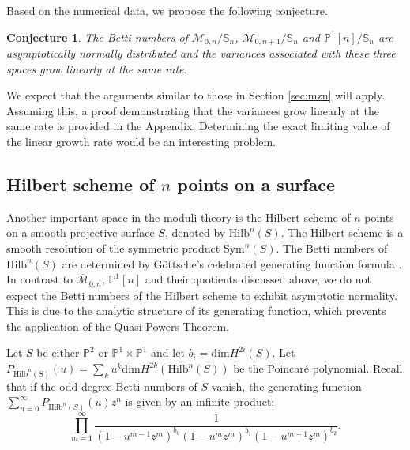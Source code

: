 \documentclass[11pt,letterpaper]{amsart}
\numberwithin{equation}{section}
\newtheorem{conjecture}[theorem]{Conjecture}
\theoremstyle{definition}
\def\red{\textcolor{red}}
\newcommand{\PP}{\mathbb{P}}
\newcommand{\cal}{\mathcal}
\def\cM{{\cal M}}
\def\mzn{\overline{\cM}_{0,n} }
\def\mzno{\overline{\cM}_{0,n+1} }
\def\dim{\mathrm{dim} }
\def\beq{\begin{equation}}
\def\eeq{\end{equation}}
\def\symS{\mathbb{S}}
\begin{document}
Based on the numerical data, we propose the following conjecture.
\begin{conjecture}
    The Betti numbers of $\mzn/\symS_n$, $\mzno/\symS_n$ and $\PP^1[n]/\symS_{n}$ are asymptotically normally distributed and the variances associated with these three spaces grow linearly at the same rate.
\end{conjecture}
We expect that the arguments similar to those in Section \ref{sec:mzn} will apply. Assuming this, a proof demonstrating that the variances grow linearly at the same rate is provided in the Appendix. Determining the exact limiting value of the linear growth rate would be an interesting problem.





\subsection{Hilbert scheme of $n$ points on a surface}


Another important space in the moduli theory is the Hilbert scheme of $n$ points on a smooth projective surface $S$, denoted by $\mathrm{Hilb}^n(S)$. The Hilbert scheme is a smooth resolution of the symmetric product $\mathrm{Sym}^n(S)$. The Betti numbers of $\mathrm{Hilb}^n(S)$ are determined by G\"{o}ttsche's celebrated generating function formula \cite{Gottsche}. In contrast to $\mzn$, $\PP^1[n]$ and their quotients discussed above, we do not expect the Betti numbers of the Hilbert scheme to exhibit asymptotic normality. This is due to the analytic structure of its generating function, which prevents the application of the Quasi-Powers Theorem.

Let $S$ be either $\PP^2$ or $\PP^1\times \PP^1$ %
and let $b_i=\dim H^{2i}(S)$. Let $P_{\mathrm{Hilb}^n(S)}(u)=\sum_k u^k\dim H^{2k}(\mathrm{Hilb}^n(S))$ be the Poincar\'e polynomial. Recall that if the odd degree Betti numbers of $S$ vanish, the generating function $ \sum_{n=0}^\infty P_{\mathrm{Hilb}^n(S)}(u) z^n  $ is given by an infinite product:
\beq \label{eq:gottsche}
\prod_{m=1}^\infty \frac{1}{(1-u^{m-1}z^m)^{b_0}(1-u^{m}z^m)^{b_1}(1-u^{m+1}z^m)^{b_2}}. \eeq
\end{document}
